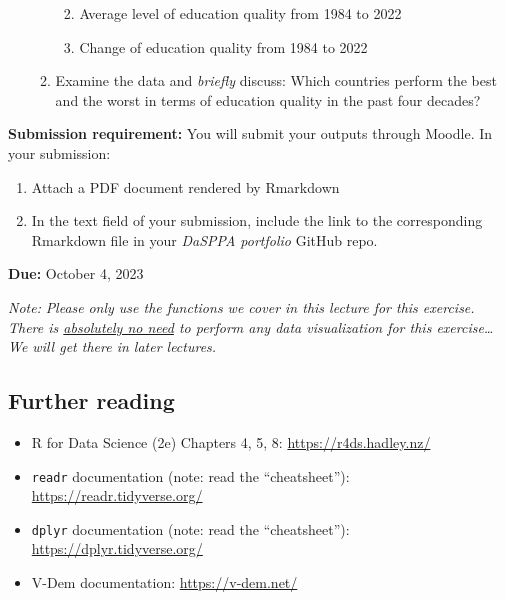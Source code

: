 \documentclass[
]{article}
\providecommand{\tightlist}{%
  \setlength{\itemsep}{0pt}\setlength{\parskip}{0pt}}
\begin{document}
\begin{enumerate}
\begin{enumerate}
    \begin{enumerate}
    \def\labelenumiii{\arabic{enumiii}.}
    \item
      Average level of education quality from 1984 to 2022
    \item
      Change of education quality from 1984 to 2022
    \end{enumerate}
  \item
    Examine the data and \emph{briefly} discuss: Which countries perform
    the best and the worst in terms of education quality in the past
    four decades?
  \end{enumerate}
\end{enumerate}

\textbf{Submission requirement:} You will submit your outputs through
Moodle. In your submission:

\begin{enumerate}
\def\labelenumi{\arabic{enumi}.}
\tightlist
\item
  Attach a PDF document rendered by Rmarkdown
\item
  In the text field of your submission, include the link to the
  corresponding Rmarkdown file in your \emph{DaSPPA portfolio} GitHub
  repo.
\end{enumerate}

\textbf{Due:} October 4, 2023

\emph{Note:} \emph{Please} \emph{only use the functions we cover in this
lecture for this exercise. There is \ul{absolutely no need} to perform
any data visualization for this exercise\ldots{} We will get there in
later lectures.}

\hypertarget{further-reading}{%
\subsection{Further reading}\label{further-reading}}

\begin{itemize}
\item
  R for Data Science (2e) Chapters 4, 5, 8:
  \url{https://r4ds.hadley.nz/}
\item
  \texttt{readr} documentation (note: read the ``cheatsheet''):
  \url{https://readr.tidyverse.org/}
\item
  \texttt{dplyr} documentation (note: read the ``cheatsheet''):
  \url{https://dplyr.tidyverse.org/}
\item
  V-Dem documentation: \url{https://v-dem.net/}
\end{itemize}
\end{document}
